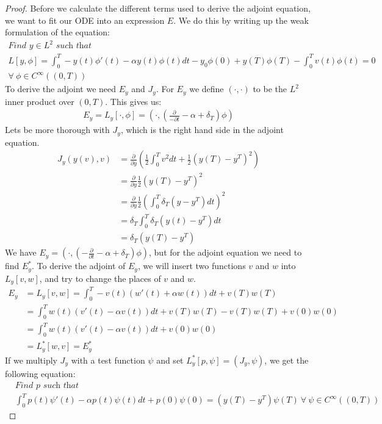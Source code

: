 \begin{proof}
Before we calculate the different terms used to derive the adjoint equation, we want to fit our ODE into an expression $E$. We do this by writing up the weak formulation of the equation:
\begin{gather*}
\textit{Find $y \in L^2$ such that}\\
L[y,\phi] = \int_0^T-y(t)\phi'(t)-\alpha y(t)\phi(t)dt -y_0\phi(0)+y(T)\phi(T)-\int_0^Tv(t)\phi(t)=0\\ \forall \ \phi \in C^{\infty}((0,T))
\end{gather*}
To derive the adjoint we need $E_y$ and $J_y$. For $E_y$ we define $(\cdot,\cdot)$ to be the $L^2$ inner product over $(0,T)$. This gives us:
\begin{align*}
E_y=L_y[\cdot,\phi]=(\cdot,(\frac{\partial}{-\partial t} - \alpha + \delta_T)\phi)  
\end{align*}
Lets be more thorough with $J_y$, which is the right hand side in the adjoint equation.
\begin{align*}
J_y(y(v),v) &= \frac{\partial}{\partial y}(\frac{1}{2}\int_0^Tv^2dt + \frac{1}{2}(y(T)-y^T)^2) \\ &= \frac{\partial}{\partial y} \frac{1}{2}(y(T)-y^T)^2 \\
&= \frac{\partial}{\partial y}\frac{1}{2}(\int_0^T \delta_T(y-y^T)dt)^2 \\
&= \delta_T\int_0^T \delta_T(y(t)-y^T)dt \\
&= \delta_T(y(T)-y^T)
\end{align*}
We have $E_y=(\cdot,(-\frac{\partial}{\partial t} - \alpha + \delta_T)\phi)$, but for the adjoint equation we need to find $E_y^*$.
To derive the adjoint of $E_y$, we will insert two functions $v$ and $w$ into $L_y[v,w]$, and try to change the places of $v$ and $w$.
\begin{align*}
E_y&=L_y[v,w]=\int_0^T-v(t)(w'(t)+\alpha w(t))dt + v(T)w(T) \\
&=\int_0^Tw(t)(v'(t)-\alpha v(t))dt + v(T)w(T)-v(T)w(T) +v(0)w(0) \\
&=\int_0^Tw(t)(v'(t)-\alpha v(t))dt+v(0)w(0) \\
&=L_y^*[w,v]=E_y^*
\end{align*}
If we multiply $J_y$ with a test function $\psi$ and set $L_y^*[p,\psi]=(J_y,\psi)$, we get the following equation:
\begin{align*}
&\textit{Find $p$ such that}\\
&\int_0^Tp(t)\psi'(t)-\alpha p(t)\psi(t)dt + p(0)\psi(0)= (y(T)-y^T)\psi(T)\ \forall \ \psi \in C^{\infty}((0,T))

\end{align*}
\end{proof}
